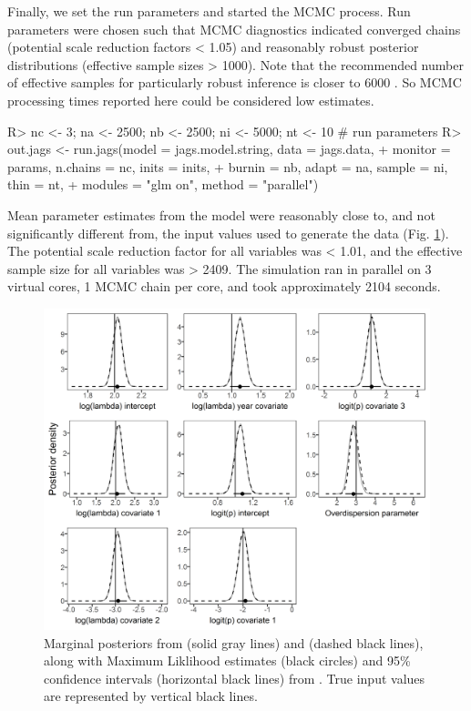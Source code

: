 \documentclass[article]{jss}
\begin{document}
Finally, we set the run parameters and started the MCMC process. Run parameters were chosen such that MCMC diagnostics indicated converged chains (potential scale reduction factors < 1.05) and reasonably robust posterior distributions (effective sample sizes > 1000). Note that the recommended number of effective samples for particularly robust inference is closer to 6000 \citep{Gong_Flegal_2016}. So MCMC processing times reported here could be considered low estimates.

\begin{Code}
R> nc <- 3; na <- 2500; nb <- 2500; ni <- 5000; nt <- 10 # run parameters
R> out.jags <- run.jags(model = jags.model.string, data = jags.data,
+                       monitor = params, n.chains = nc, inits = inits,
+                       burnin = nb, adapt = na, sample = ni, thin = nt,
+                       modules = "glm on", method = "parallel")
\end{Code}

Mean parameter estimates from the  model were reasonably close to, and not significantly different from, the input values used to generate the data (Fig. \ref{fig:fig1}). The potential scale reduction factor for all variables was < 1.01, and the effective sample size for all variables was > 2409. The simulation ran in parallel on 3 virtual cores, 1 MCMC chain per core, and took approximately 2104 seconds.

\begin{figure}
  \includegraphics[width=\linewidth]{fig1.png}
  \caption{Marginal posteriors from  (solid gray lines) and  (dashed black lines), along with Maximum Liklihood estimates (black circles) and 95\% confidence intervals (horizontal black lines) from .  True input values are represented by vertical black lines.}
  \label{fig:fig1}
\end{figure}
\end{document}
